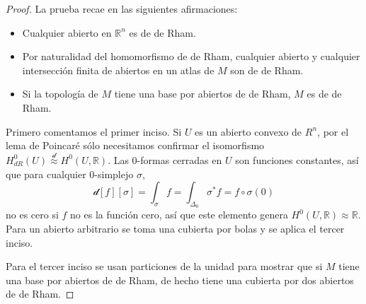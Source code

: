 \documentclass[spanish]{article}
\theoremstyle{definition}
\newcommand{\R}{\mathbb{R}}
\begin{document}
\begin{proof}
		
		
		\iffalse
		La prueba recae en las siguientes afirmaciones:
		\begin{itemize}
			
			
			
			\item Cualquier abierto en $\R^n$ es de de Rham.
			
			\item Por naturalidad del homomorfismo de de Rham, cualquier abierto y cualquier intersección finita de abiertos en un atlas de $M$ son de de Rham.
			
			\item Si la topología de $M$ tiene una base por abiertos de de Rham, $M$ es de de Rham.
			
			
		\end{itemize}
		
		Primero comentamos el primer inciso. Si $U$ es un abierto convexo de $R^n$, por el lema de Poincaré sólo necesitamos confirmar el isomorfismo $H^0_{dR}(U)\overset{\mathcal{d}}{\approx}H^0(U,\R)$. Las 0-formas cerradas en $U$ son funciones constantes, así que para cualquier 0-simplejo $\sigma$,
		\[\mathcal{d}[f][\sigma]=\int_{\sigma}f=\int_{\Delta_0}\sigma^*f=f\circ\sigma(0)\]
		no es cero si $f$ no es la función cero, así que este elemento genera $H^0(U,\R)\approx\R$. Para un abierto arbitrario se toma una cubierta por bolas y se aplica el tercer inciso.
		
		Para el tercer inciso se usan particiones de la unidad para mostrar que si $M$ tiene una base por abiertos de de Rham, de hecho tiene una cubierta por dos abiertos de de Rham.
		

\end{proof}
\end{document}
